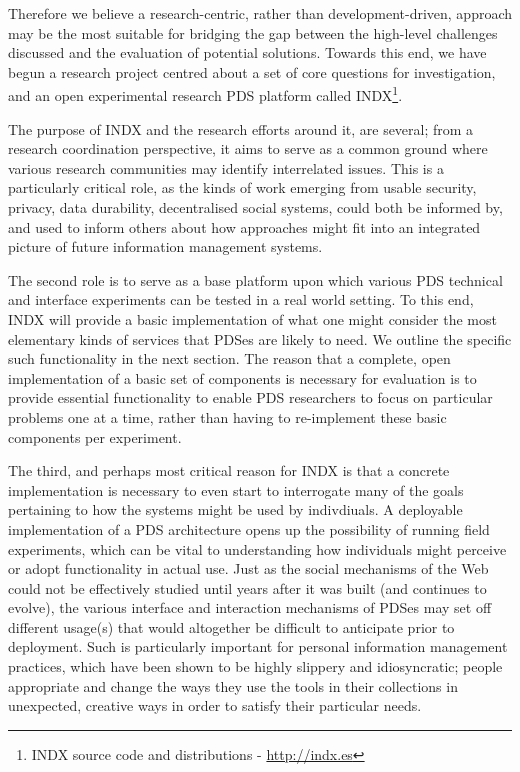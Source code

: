 \documentclass[graybox]{svmult}
\begin{document}
Therefore we believe a research-centric, rather than development-driven, approach may be the most suitable for bridging the gap between the high-level challenges discussed and the evaluation of potential solutions.  Towards this end, we have begun a research project centred about a set of core questions for investigation, and an open experimental research PDS platform called INDX\footnote{ INDX source code and distributions - \url{http://indx.es} }.

The purpose of INDX and the research efforts around it, are several; from a research coordination perspective, it aims to serve as a common ground where various research communities may identify interrelated issues.  This is a particularly critical role, as the kinds of work emerging from usable security, privacy, data durability, decentralised social systems, could both be informed by, and used to inform others about how approaches might fit into an integrated picture of future information management systems.

The second role is to serve as a base platform upon which various PDS technical and interface experiments can be tested in a real world setting.  To this end, INDX will provide a basic implementation of what one might consider the most elementary kinds of services that PDSes are likely to need.  We outline the specific such functionality in the next section.  The reason that a complete, open implementation of a basic set of components is necessary for evaluation is to provide essential functionality to enable PDS researchers to focus on particular problems one at a time, rather than having to re-implement these basic components per experiment.  

The third, and perhaps most critical reason for INDX is that a concrete implementation is necessary to even start to interrogate many of the goals pertaining to how the systems might be used by indivdiuals.  A deployable implementation of a PDS architecture opens up the possibility of running field experiments, which can be vital to understanding how individuals might perceive or adopt functionality in actual use.  Just as the social mechanisms of the Web could not be effectively studied until years after it was built (and continues to evolve), the various interface and interaction mechanisms of PDSes may set off different usage(s) that would altogether be difficult to anticipate prior to deployment.   Such is particularly important for personal information management practices, which have been shown to be highly slippery and idiosyncratic; people appropriate and change the ways they use the tools in their collections in unexpected, creative ways in order to satisfy their particular needs.
\end{document}
